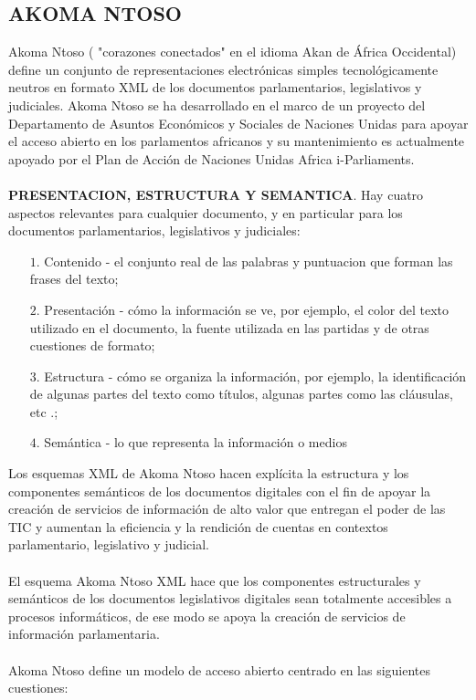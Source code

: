\documentclass[conference]{IEEEtran}
\begin{document}
 
\subsection{AKOMA NTOSO}  
   Akoma Ntoso ( "corazones conectados" en el idioma Akan de África Occidental) define un conjunto de representaciones electrónicas simples tecnológicamente neutros en formato XML de los documentos parlamentarios, legislativos y judiciales.  Akoma Ntoso se ha desarrollado en el marco de un proyecto del Departamento de Asuntos Económicos y Sociales de Naciones Unidas para apoyar el acceso abierto en los parlamentos africanos y su mantenimiento es actualmente apoyado por el Plan de Acción de Naciones Unidas Africa i-Parliaments. \\ \\
   \textbf{PRESENTACION, ESTRUCTURA Y SEMANTICA}. Hay cuatro aspectos relevantes para cualquier documento, y en particular para los documentos parlamentarios, legislativos y judiciales:
 \begin{itemize}   
   \item[$1.$]	Contenido - el conjunto real de las palabras y puntuacion que forman las frases del texto;
   \item[$2.$]	Presentación - cómo la información se ve, por ejemplo, el color del texto utilizado en el documento, la fuente utilizada en las partidas y de otras cuestiones de formato;
   \item[$3.$]	Estructura - cómo se organiza la información, por ejemplo, la identificación de algunas partes del texto como títulos, algunas partes como las cláusulas, etc .;
   \item[$4.$]	Semántica - lo que representa la información o medios
 \end{itemize}   
   Los esquemas XML de Akoma Ntoso hacen explícita la estructura y los componentes semánticos de los documentos digitales con el fin de apoyar la creación de servicios de información de alto valor que entregan el poder de las TIC y aumentan la eficiencia y la rendición de cuentas en contextos parlamentario, legislativo y judicial.\\ \\
   El esquema Akoma Ntoso XML hace que los componentes estructurales y semánticos de los documentos legislativos digitales sean totalmente accesibles a procesos informáticos, de ese modo se apoya la creación de servicios de información parlamentaria. \\ \\
   Akoma Ntoso define un modelo de acceso abierto centrado en las siguientes cuestiones:
\end{document}
